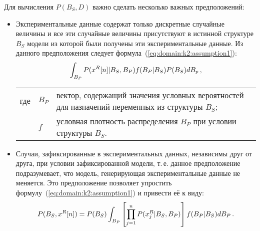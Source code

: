 Для вычисления $P(B_S, D)$ важно сделать несколько важных предположений:

\begin{itemize}
  \item 
  Экспериментальные данные содержат только дискретные случайные величины и все эти случайные величины присутствуют в истинной структуре $B_S$ модели из которой были получены эти экспериментальные данные.
  Из данного предположения следует формула~(\ref{eq:domain:k2:assumption1}):
  \begin{equation}
    \label{eq:domain:k2:assumption1}
    \int_{B_P} P(x^R[n] | B_S, B_P) f(B_P | B_S) P(B_S) dB_p \text{\,,}
  \end{equation}
  \par\hspace{\fivecharsapprox} %
  \begin{tabular}{@{}ll@{ --- }p{}}
  где & $ B_P $ & вектор, содержащий значения условных вероятностей для назначений переменных из структуры $ B_S $; \\
      & $ f $ & условная плотность распределения $B_P$ при условии структуры $B_S$. \\[\parsep]
  \end{tabular}

  \item
  Случаи, зафиксированные в экспериментальных данных, независимы друг от друга, при условии зафиксированной модели, т.\,е. данное предположение подразумевает, что модель, генерирующая экспериментальные данные не меняется.
  Это предположение позволяет упростить формулу~(\ref{eq:domain:k2:assumption1}) и привести её к виду:
  \begin{equation}
    \label{eq:domain:k2:assumption2}
    P(B_S, x^R[n]) =
      P(B_S) \int_{B_P} \left[ \prod_{j = 1}^{n} P(x^R_j | B_S, B_P) \right] f(B_P | B_S) dB_P \text{\,.}
  \end{equation}


\end{itemize}
